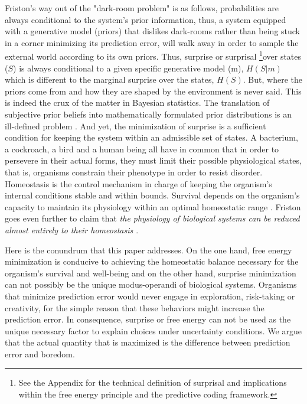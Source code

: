 \documentclass[11pt, onecolumn]{article}
\begin{document}
Friston's way out of the "dark-room problem" is as follows, probabilities are always conditional to the system's prior information, thus, a system equipped with a generative model (priors) that dislikes dark-rooms rather than being stuck in a corner minimizing its prediction error, will walk away in order to sample the external world according to its own priors. Thus, surprise or surprisal  \footnote{See the Appendix for the technical definition of surprisal and implications within the free energy principle and the predictive coding framework.}over states ($S$) is always conditional to a given specific generative model (m), $H(S|m)$ which is different to the marginal surprise over the states, $H(S)$.
But, where the priors come from and how they are shaped by the environment is never said. This is indeed the crux of the matter in Bayesian statistics. The translation of subjective prior beliefs into mathematically formulated prior distributions is an ill-defined problem \citep{Gomez-ramirez_limitations_2013}. 
And yet, the minimization of surprise is a sufficient condition for keeping the system within an admissible set of states. 
A bacterium, a cockroach, a bird and a human being all have in common that in order to persevere in their actual forms, they must limit their possible physiological states, that is, organisms constrain their phenotype in order to resist disorder. 
Homeostasis is the control mechanism in charge of keeping the organism's internal conditions stable and within bounds. Survival depends on the organism's capacity to maintain its physiology within an optimal homeostatic range \citep{damasio_nature_2013}. Friston goes even further to claim that \emph{the physiology of biological systems can be reduced almost entirely to their homeostasis \citep{friston_free-energy_2010}}. 

Here is the conundrum that this paper addresses. On the one hand, free energy minimization is conducive to achieving the homeostatic balance necessary for the organism's survival and well-being and on the other hand, surprise minimization can not possibly be the unique modus-operandi of biological systems. Organisms that minimize prediction error would never engage in exploration, risk-taking or creativity, for the simple reason that these behaviors might increase the prediction error. 
In consequence, surprise or free energy can not be used as the unique necessary factor to explain choices under uncertainty conditions. We argue that the actual quantity that is maximized is the difference between prediction error and boredom. 
\end{document}
